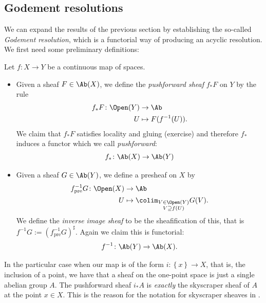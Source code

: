 \documentclass[11pt]{amsart}
\begin{document}
\subsection{Godement resolutions}

We can expand the results of the previous section by establishing the so-called \emph{Godement resolution}, which is a functorial way of producing an acyclic resolution. We first need some preliminary definitions:

\begin{definition}\label{def:pullback-pushforward} Let $f \colon X \to Y$ be a continuous map of spaces.
\begin{itemize}
    \item Given a sheaf $F\in \Ab(X)$, we define the \emph{pushforward sheaf} $f_\ast F$ on $Y$ by the rule
    \begin{align*}
        f_\ast F \colon \Open(Y) &\to \Ab \\
        U &\mapsto F(f^{-1}(U)).
    \end{align*}
    We claim that $f_\ast F$ satisfies locality and gluing (exercise) and therefore $f_\ast$ induces a functor which we call \emph{pushforward}:
    \begin{align*}
        f_\ast \colon \Ab(X) \to \Ab(Y)
    \end{align*}
    \item Given a sheaf $G\in \Ab(Y)$, we define a presheaf on $X$ by
    \begin{align*}
        f^{-1}_\text{pre}G \colon \Open(X) &\to \Ab \\
        U &\mapsto \colim_{\substack{V\in \Open(Y) \\ V \supseteq f(U)}} G(V).
    \end{align*}
    We define the \emph{inverse image sheaf} to be the sheafification of this, that is $f^{-1}G := (f^{-1}_\text{pre}G)^\sharp$. Again we claim this is functorial:
    \begin{align*}
        f^{-1} \colon \Ab(Y) \to \Ab(X).
    \end{align*}
\end{itemize}
\end{definition}

\begin{example} In the particular case when our map is of the form $i \colon \left\{ x \right\} \to X$, that is, the inclusion of a point, we have that a sheaf on the one-point space is just a single abelian group $A$. The pushforward sheaf $i_\ast A$ is \emph{exactly} the skyscraper sheaf of $A$ at the point $x \in X$. This is the reason for the notation for skyscraper sheaves in .
\end{example}
\end{document}
